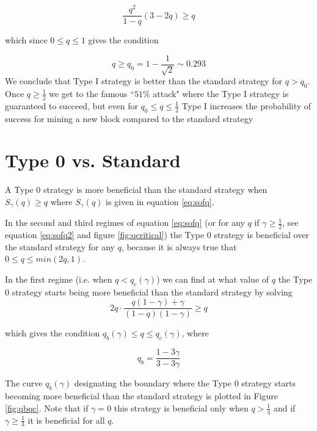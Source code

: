\documentclass[letterpaper,12pt]{report}
\theoremstyle{plain}
\theoremstyle{definition}
\begin{document}
\begin{equation}\label{eq:type1overstandard}
\dfrac{q^2}{1-q}\left(3-2q\right) \geq q
\end{equation}

which since $0\leq q \leq 1$ gives the condition 

\begin{equation}\label{eq:qnot}
q\geq q_0=1-\frac{1}{\sqrt{2}} \sim 0.293
\end{equation}
We conclude that Type I strategy is better than the standard strategy for $q>q_0$. Once $q\geq \frac{1}{2}$ we get to the famous ``$51\%$ attack" where the Type I strategy is guaranteed to succeed, but even for $q_0\leq q \leq \frac{1}{2}$ Type I increases the probability of success for mining a new block compared to the standard strategy

\section{Type 0 vs. Standard}\label{Type0overStandard}

A Type 0 strategy is more beneficial than the standard strategy when $S_\gamma(q)\geq q$ where $S_\gamma(q)$ is given in equation \ref{eq:sofq}. 

In the second and third regimes of equation \ref{eq:sofq} (or for any $q$ if $\gamma\geq\frac{1}{2}$, see equation \ref{eq:sofq2} and figure \ref{fig:qcritical}) the Type 0 strategy is beneficial over the standard strategy for any $q$, because it is always true that $0\leq q \leq min(2q,1)$. 

In the first regime (i.e. when $q<q_c(\gamma)$) we can find at what value of $q$ the Type 0 strategy starts being more beneficial than the standard strategy by solving
\begin{equation}\label{eq:type0benefitonhonestequation}
2q\cdot\frac{q(1-\gamma)+\gamma}{(1-q)(1-\gamma)}\geq q
\end{equation}

which gives the condition $q_b(\gamma)\leq q \leq q_c(\gamma)$, where 

\begin{equation}\label{eq:qb}
q_b= \dfrac{1-3\gamma}{3-3\gamma}
\end{equation}

The curve $q_b(\gamma)$ designating the boundary where the Type 0 strategy starts becoming more beneficial than the standard strategy is plotted in Figure \ref{fig:qbqc}.
Note that if $\gamma=0$ this strategy is beneficial only when $q>\frac{1}{3}$ and if $\gamma\geq\frac{1}{3}$ it is beneficial for all $q$.
\end{document}
